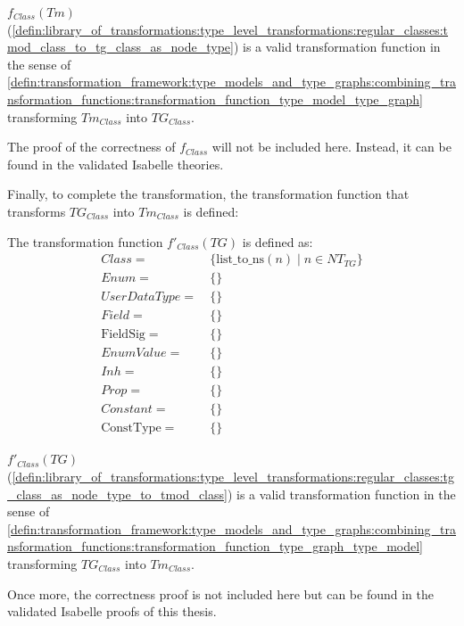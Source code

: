 \begin{thm}
\label{defin:library_of_transformations:type_level_transformations:regular_classes:tmod_class_to_tg_class_as_node_type_func}
$f_{Class}(Tm)$ (\cref{defin:library_of_transformations:type_level_transformations:regular_classes:tmod_class_to_tg_class_as_node_type}) is a valid transformation function in the sense of \cref{defin:transformation_framework:type_models_and_type_graphs:combining_transformation_functions:transformation_function_type_model_type_graph} transforming $Tm_{Class}$ into $TG_{Class}$.
\end{thm}

The proof of the correctness of $f_{Class}$ will not be included here. Instead, it can be found in the validated Isabelle theories.

Finally, to complete the transformation, the transformation function that transforms $TG_{Class}$ into $Tm_{Class}$ is defined:

\begin{defin}
\label{defin:library_of_transformations:type_level_transformations:regular_classes:tg_class_as_node_type_to_tmod_class}
The transformation function $f'_{Class}(TG)$ is defined as:
\begin{align*}
Class =\ &\{\mathrm{list\_\!to\_\!ns}(n) \mid n \in NT_{TG}\} \\
Enum =\ &\{\} \\
UserDataType =\ &\{\} \\
Field =\ &\{\} \\
\mathrm{FieldSig} =\ &\{\} \\
EnumValue =\ &\{\} \\
Inh =\ &\{\} \\
Prop =\ &\{\} \\
Constant =\ &\{\} \\
\mathrm{ConstType} =\ &\{\}
\end{align*}
\end{defin}

\begin{thm}
\label{defin:library_of_transformations:type_level_transformations:regular_classes:tg_class_as_node_type_to_tmod_class_func}
$f'_{Class}(TG)$ (\cref{defin:library_of_transformations:type_level_transformations:regular_classes:tg_class_as_node_type_to_tmod_class}) is a valid transformation function in the sense of \cref{defin:transformation_framework:type_models_and_type_graphs:combining_transformation_functions:transformation_function_type_graph_type_model} transforming $TG_{Class}$ into $Tm_{Class}$.
\end{thm}

Once more, the correctness proof is not included here but can be found in the validated Isabelle proofs of this thesis.